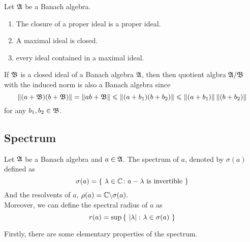 \documentclass[a4paper,11pt]{report}
\begin{document}
\begin{cor}
	Let $\mathfrak{A}$ be a Banach algebra.
	\begin{enumerate}[label=\arabic*)]
		\item The closure of a proper ideal is a proper ideal.
		\item A maximal ideal is closed.
		\item every ideal contained in a maximal ideal.
	\end{enumerate}
\end{cor}

If $\mathfrak{B}$ is a closed ideal of a Banach algebra $\mathfrak{A}$, then then quotient algbra $\mathfrak{A}/\mathfrak{B}$ with the induced norm is also a Banach algebra since 
\begin{equation*}
	\left\lVert(a+\mathfrak{B})(b+\mathfrak{B})\right\lVert = \left\lVert ab+\mathfrak{B}\right\lVert \leqslant \left\lVert(a+b_1)(b+b_2)\right\lVert \leqslant \left\lVert(a+b_1)\right\lVert\left\lVert(b+b_2)\right\lVert
\end{equation*}
for any $b_1, b_2 \in \mathfrak{B}$.

\subsection{Spectrum}


\begin{defn}
	Let $\mathfrak{A}$ be a Banach algebra and $a \in \mathfrak{A}$. The spectrum of $a$, denoted by $\sigma(a)$ defined as
	\begin{equation*}
		\sigma(a) = \{~ \lambda \in \mathbb{C} \colon a-\lambda \text{ is invertible}~\}
	\end{equation*}	
	And the resolvents of $a$, $\rho(a) = \mathbb{C} \backslash \sigma(a)$.\\
	Moreover, we can define the spectral radius of $a$ as
	\begin{equation*}
		r(a) = \sup{\{~\left\lvert\lambda\right\lvert \colon \lambda \in \sigma(a)~\}}
	\end{equation*}
\end{defn}

Firstly, there are some elementary properties of the spectrum.
\end{document}
